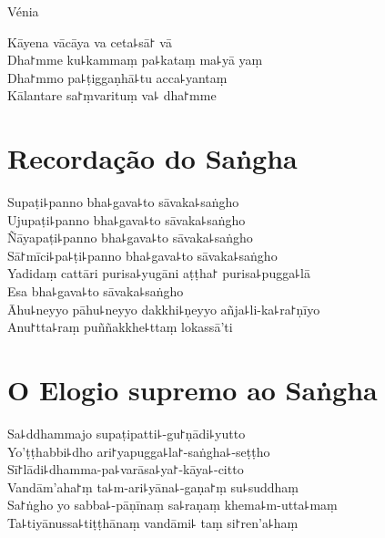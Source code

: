 \clearpage

\begin{instruction}
  Vénia
\end{instruction}

Kāyena vācāya va ceta꜕sā꜓ vā\\
Dha꜓mme ku꜕kammaṃ pa꜕kataṃ ma꜕yā yaṃ\\
Dha꜓mmo pa꜕ṭiggaṇhā꜕tu acca꜕yantaṃ\\
Kālantare sa꜓ṃvarituṃ va꜕ dha꜓mme

\chapter*{Recordação do Saṅgha}

\delegateSetUseNext

\begin{leader}
\end{leader}

Supaṭi꜕panno bha꜕gava꜕to sāvaka꜕saṅgho\\
Ujupaṭi꜕panno bha꜕gava꜕to sāvaka꜕saṅgho\\
Ñāyapaṭi꜕panno bha꜕gava꜕to sāvaka꜕saṅgho\\
Sā꜓mīci꜕pa꜕ṭi꜕panno bha꜕gava꜕to sāvaka꜕saṅgho\\
Yadidaṃ cattāri purisa꜕yugāni aṭṭha꜓ purisa꜕pugga꜕lā\\
Esa bha꜕gava꜕to sāvaka꜕saṅgho\\
Āhu꜕neyyo pāhu꜕neyyo dakkhi꜕ṇeyyo añja꜕li-ka꜕ra꜓ṇīyo\\
Anu꜓tta꜕raṃ puññakkhe꜕ttaṃ lokassā'ti

\chapter*{O Elogio supremo ao Saṅgha}

\begin{leader}
\end{leader}

Sa꜕ddhammajo supaṭipatti꜕-gu꜓ṇādi꜕yutto\\
Yo'ṭṭhabbi꜕dho ari꜓yapugga꜕la꜓-saṅgha꜕-seṭṭho\\
Sī꜓lādi꜕dhamma-pa꜕varāsa꜕ya꜓-kāya꜕-citto\\
Vandām'aha꜓ṃ ta꜕m-ari꜕yāna꜕-gaṇa꜓ṃ su꜕suddhaṃ\\
Sa꜓ṅgho yo sabba꜕-pāṇīnaṃ sa꜕raṇaṃ khema꜕m-utta꜕maṃ\\
Ta꜕tiyānussa꜕tiṭṭhānaṃ vandāmi꜕ taṃ si꜓ren'a꜕haṃ

